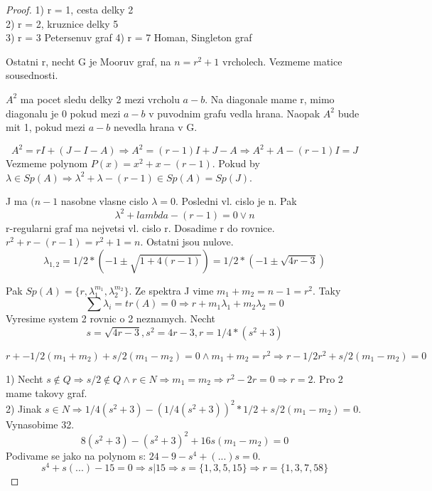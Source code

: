 \begin{proof}
	1) r = 1, cesta delky 2\\
	2) r = 2, kruznice delky 5\\
	3) r = 3 Petersenuv graf
	4) r = 7 Homan, Singleton graf

	Ostatni r, necht G je Mooruv graf, na $n = r^2 + 1$ vrcholech. Vezmeme matice sousednosti.

	$A^2$ ma pocet sledu delky 2 mezi vrcholu $a - b$. Na diagonale mame r, mimo diagonalu je 0 pokud mezi $a - b$ v puvodnim grafu vedla hrana. Naopak $A^2$ bude mit 1, pokud mezi $a - b$ nevedla hrana v G.

	\[A^2 = rI + (J - I - A) \Rightarrow A^2 = (r - 1) I + J - A \Rightarrow A^2 + A - (r - 1)I = J \]
	Vezmeme polynom $P(x) = x^2 + x - (r-1)$. Pokud by $\lambda \in Sp(A) \Rightarrow \lambda^2 + \lambda - (r - 1) \in Sp(A) = Sp(J)$.

	J ma $(n-1$ nasobne vlasne cislo $\lambda = 0$. Posledni vl. cislo je n. Pak
	\[ \lambda^2 + lambda - (r - 1) = 0 \lor n \]
	r-regularni graf ma nejvetsi vl. cislo r. Dosadime r do rovnice. $ r^2 + r - (r - 1) = r^2 + 1 = n $.
	Ostatni jsou nulove.
	\[ \lambda_{1,2} = 1/2 * (-1 \pm \sqrt{1 + 4 (r-1)}) = 1/2 * (-1 \pm \sqrt{4r - 3}) \]

	Pak $ Sp(A) = \{ r, \lambda_1^{m_1}, \lambda_2^{m_2} \} $. Ze spektra J vime $m_1 + m_2 = n-1 = r^2$. Taky
	\[ \sum \lambda_i = tr(A) = 0 \Rightarrow r + m_1 \lambda_1 + m_2 \lambda_2 = 0 \]
	Vyresime system 2 rovnic o 2 neznamych. Necht
	\[s = \sqrt{4r - 3}, s^2 = 4r - 3, r = 1/4 * (s^2 + 3)\]

	\[ r + -1/2 (m_1 + m_2) + s/2 (m_1 - m_2) = 0 \land m_1 + m_2 = r^2 \Rightarrow r - 1/2 r^2 + s/2 (m_1 - m_2) = 0 \]

	1) Necht $s \notin Q \Rightarrow s/2 \notin Q \land r \in N \Rightarrow m_1 = m_2 \Rightarrow r^2 - 2r = 0 \Rightarrow r = 2$. Pro 2 mame takovy graf.\\
	2) Jinak $ s \in N \Rightarrow 1/4 (s^2 + 3) - (1/4 (s^2 + 3))^2 * 1/2 + s/2 (m_1 - m_2) = 0$. Vynasobime 32.
	\[ 8(s^2 + 3) - (s^2 + 3)^2 + 16s(m_1 - m_2) = 0 \]
	Podivame se jako na polynom s: $24 - 9 - s^4 + (...) s = 0$.
	\[ s^4 + s(...) - 15 = 0 \Rightarrow s | 15 \Rightarrow s = \{ 1, 3, 5, 15 \} \Rightarrow r = \{1, 3, 7, 58 \} \]
\end{proof}
